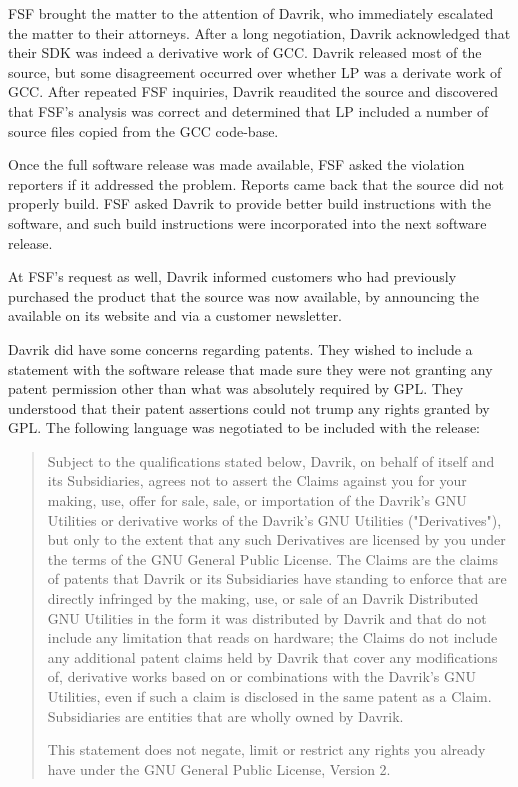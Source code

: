 \documentclass[12pt]{report}
\begin{document}
FSF brought the matter to the attention of Davrik, who immediately
escalated the matter to their attorneys.  After a long negotiation, Davrik
acknowledged that their SDK was indeed a derivative work of GCC\@.  Davrik
released most of the source, but some disagreement occurred over whether
LP was a derivate work of GCC\@.  After repeated FSF inquiries, Davrik
reaudited the source and discovered that FSF's analysis was correct and
determined that LP included a number of source files copied from the GCC
code-base.

\label{davrik-build-problems}
Once the full software release was made available, FSF asked the violation
reporters if it addressed the problem.  Reports came back that the source
did not properly build.  FSF asked Davrik to provide better build
instructions with the software, and such build instructions were
incorporated into the next software release.

At FSF's request as well, Davrik informed customers who had previously
purchased the product that the source was now available, by announcing
the available on its website and via a customer newsletter.

Davrik did have some concerns regarding patents.  They wished to include a
statement with the software release that made sure they were not granting
any patent permission other than what was absolutely required by GPL\@.
They understood that their patent assertions could not trump any rights
granted by GPL\@.  The following language was negotiated to be included
with the release:

\begin{quotation}
Subject to the qualifications stated below, Davrik, on behalf of itself
and its Subsidiaries, agrees not to assert the Claims against you for your
making, use, offer for sale, sale, or importation of the Davrik's GNU
Utilities or derivative works of the Davrik's GNU Utilities
("Derivatives"), but only to the extent that any such Derivatives are
licensed by you under the terms of the GNU General Public License.  The
Claims are the claims of patents that Davrik or its Subsidiaries have
standing to enforce that are directly infringed by the making, use, or
sale of an Davrik Distributed GNU Utilities in the form it was distributed
by Davrik and that do not include any limitation that reads on hardware;
the Claims do not include any additional patent claims held by Davrik that
cover any modifications of, derivative works based on or combinations with
the Davrik's GNU Utilities, even if such a claim is disclosed in the same
patent as a Claim.  Subsidiaries are entities that are wholly owned by
Davrik.

This statement does not negate, limit or restrict any rights you already
have under the GNU General Public License, Version 2.
\end{quotation}
\end{document}
